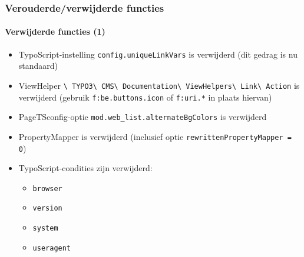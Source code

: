 \begin{frame}[fragile]
	\frametitle{Verouderde/verwijderde functies}
	\framesubtitle{Verwijderde functies (1)}

	\begin{itemize}

		\item
			\small
				TypoScript-instelling \texttt{config.uniqueLinkVars} is verwijderd\newline
				(dit gedrag is nu standaard)
			\normalsize

		\item
			\small
				ViewHelper
					\texttt{\textbackslash
						TYPO3\textbackslash
						CMS\textbackslash
						Documentation\textbackslash
						ViewHelpers\textbackslash
						Link\textbackslash
						Action}
					is verwijderd (gebruik \texttt{f:be.buttons.icon} of \texttt{f:uri.*} in plaats hiervan)
			\normalsize

		\item
			\small
				PageTSconfig-optie \texttt{mod.web\_list.alternateBgColors}\newline
				is verwijderd
			\normalsize

		\item
			\small
				PropertyMapper is verwijderd\newline
				(inclusief optie \texttt{rewrittenPropertyMapper = 0})
			\normalsize

		\item
			\small
				TypoScript-condities zijn verwijderd:

					\begin{itemize}
						\item\texttt{browser}
						\item\texttt{version}
						\item\texttt{system}
						\item\texttt{useragent}
					\end{itemize}
			\normalsize

	\end{itemize}

\end{frame}



